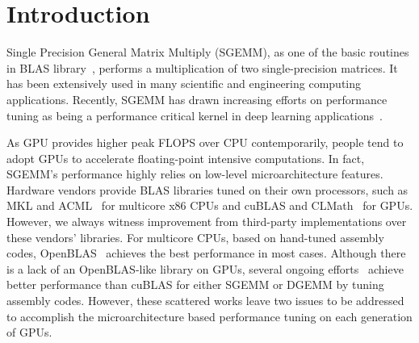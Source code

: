\section{Introduction}
Single Precision General Matrix Multiply (SGEMM), as one 
of the basic routines in BLAS library~\cite{blas}, performs a multiplication of two single-precision matrices. 
It has been extensively used in many scientific and engineering 
computing applications. 
Recently, SGEMM has drawn increasing efforts on performance tuning as being a performance 
critical kernel in deep learning applications~\cite{chetlur2014cudnn,nervana_sgemm_wiki}.


As GPU provides higher peak FLOPS over CPU contemporarily, people tend to adopt GPUs to accelerate
floating-point intensive computations. In fact, SGEMM's performance highly relies on low-level microarchitecture 
features. Hardware
vendors provide BLAS libraries tuned on their own processors, such as MKL and ACML~\cite{intel2007intel,amd2014} for multicore 
x86 CPUs and cuBLAS and CLMath~\cite{nvidia2008cublas, clmath} for
GPUs. However, we always witness improvement from third-party implementations over these vendors' libraries. For
multicore CPUs, based on hand-tuned assembly codes, OpenBLAS~\cite{xianyi2012openblas} achieves the best performance in 
most cases.
Although there is a lack of an OpenBLAS-like library on GPUs, several ongoing efforts~\cite{tan,lai,nervana_sgemm_wiki,
chien, volkov} achieve better performance than cuBLAS for either SGEMM or DGEMM by tuning assembly codes. However, 
these scattered works leave two issues to be addressed to accomplish the microarchitecture based performance tuning on 
each generation of GPUs.


